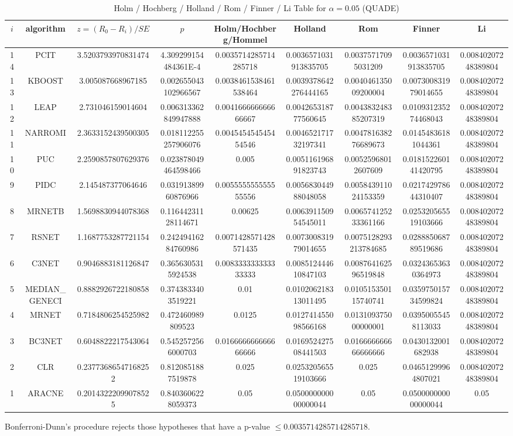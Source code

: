 \documentclass[a4paper,10pt]{article}
\begin{document}
\begin{landscape}
\begin{table}[!htp]
\centering\scriptsize
\caption{Holm / Hochberg / Holland / Rom / Finner / Li Table for $\alpha=0.05$ (QUADE)}
\begin{tabular}{ccccccccc}
$i$&algorithm&$z=(R_0 - R_i)/SE$&$p$&Holm/Hochberg/Hommel&Holland&Rom&Finner&Li\\
\hline
14&PCIT&3.5203793970831474&4.309299154484361E-4&0.0035714285714285718&0.0036571031913835705&0.00375717095031209&0.0036571031913835705&0.00840207248389804\\
13&KBOOST&3.005087668967185&0.002655043102966567&0.0038461538461538464&0.0039378642276444165&0.004046135009200004&0.007300831979014655&0.00840207248389804\\
12&LEAP&2.731046159014604&0.006313362849947888&0.004166666666666667&0.004265318777560645&0.004383248385207319&0.010931235274468043&0.00840207248389804\\
11&NARROMI&2.3633152439500305&0.018112255257906076&0.004545454545454546&0.004652171732197341&0.004781638276689673&0.01454836181044361&0.00840207248389804\\
10&PUC&2.2590857807629376&0.023878049464598466&0.005&0.005116196891823743&0.00525968012607609&0.018152260141420795&0.00840207248389804\\
9&PIDC&2.145487377064646&0.03191389960876966&0.005555555555555556&0.005683044988048058&0.005843911024153359&0.021742978644310407&0.00840207248389804\\
8&MRNETB&1.5698830944078368&0.11644231128114671&0.00625&0.006391150954545011&0.006574125233361166&0.025320565519103666&0.00840207248389804\\
7&RSNET&1.1687753287721154&0.24249416284760986&0.0071428571428571435&0.007300831979014655&0.0075128293213784685&0.028885068789519686&0.00840207248389804\\
6&C3NET&0.9046883181126847&0.3656305315924538&0.008333333333333333&0.008512444610847103&0.008764162596519848&0.03243653630364973&0.00840207248389804\\
5&MEDIAN_GENECI&0.8882926722180858&0.3743833403519221&0.01&0.010206218313011495&0.010515350115740741&0.035975015734599824&0.00840207248389804\\
4&MRNET&0.7184806254525982&0.472460989809523&0.0125&0.012741455098566168&0.013109375000000001&0.03950055458113033&0.00840207248389804\\
3&BC3NET&0.6048822217543064&0.5452572566000703&0.016666666666666666&0.016952427508441503&0.016666666666666666&0.0430132001682938&0.00840207248389804\\
2&CLR&0.23773686547168252&0.8120851887519878&0.025&0.025320565519103666&0.025&0.04651299964807021&0.00840207248389804\\
1&ARACNE&0.20143222099078525&0.8403606228059373&0.05&0.050000000000000044&0.05&0.050000000000000044&0.05\\
\hline
\end{tabular}
\end{table}
Bonferroni-Dunn's procedure rejects those hypotheses that have a p-value $\le0.0035714285714285718$.



\end{landscape}
\end{document}
